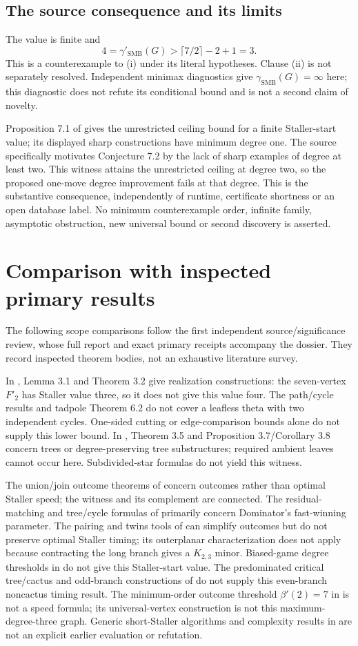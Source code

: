 \documentclass[11pt]{article}
\newcommand{\gs}{\gamma'_{\mathrm{SMB}}}
\newcommand{\gd}{\gamma_{\mathrm{SMB}}}
\begin{document}
\subsection{The source consequence and its limits}
The value is finite and
\[
4=\gs(G)>\lceil7/2\rceil-2+1=3.
\]
This is a counterexample to (i) under its literal hypotheses. Clause (ii) is not separately resolved. Independent minimax diagnostics give $\gd(G)=\infty$ here; this diagnostic does not refute its conditional bound and is not a second claim of novelty.

Proposition 7.1 of \cite{BD} gives the unrestricted ceiling bound for a finite Staller-start value; its displayed sharp constructions have minimum degree one. The source specifically motivates Conjecture 7.2 by the lack of sharp examples of degree at least two. This witness attains the unrestricted ceiling at degree two, so the proposed one-move degree improvement fails at that degree. This is the substantive consequence, independently of runtime, certificate shortness or an open database label. No minimum counterexample order, infinite family, asymptotic obstruction, new universal bound or second discovery is asserted.

\section{Comparison with inspected primary results}
The following scope comparisons follow the first independent source/significance review, whose full report and exact primary receipts accompany the dossier. They record inspected theorem bodies, not an exhaustive literature survey.

In \cite{BD}, Lemma 3.1 and Theorem 3.2 give realization constructions: the seven-vertex $F'_2$ has Staller value three, so it does not give this value four. The path/cycle results and tadpole Theorem 6.2 do not cover a leafless theta with two independent cycles. One-sided cutting or edge-comparison bounds alone do not supply this lower bound. In \cite{trees}, Theorem 3.5 and Proposition 3.7/Corollary 3.8 concern trees or degree-preserving tree substructures; required ambient leaves cannot occur here. Subdivided-star formulas do not yield this witness.

The union/join outcome theorems of \cite{original} concern outcomes rather than optimal Staller speed; the witness and its complement are connected. The residual-matching and tree/cycle formulas of \cite{numbers} primarily concern Dominator's fast-winning parameter. The pairing and twins tools of \cite{partition} can simplify outcomes but do not preserve optimal Staller timing; its outerplanar characterization does not apply because contracting the long branch gives a $K_{2,3}$ minor. Biased-game degree thresholds in \cite{biased} do not give this Staller-start value. The predominated critical tree/cactus and odd-branch constructions of \cite{critical} do not supply this even-branch noncactus timing result. The minimum-order outcome threshold $\beta'(2)=7$ in \cite{minimum} is not a speed formula; its universal-vertex construction is not this maximum-degree-three graph. Generic short-Staller algorithms and complexity results in \cite{complexity} are not an explicit earlier evaluation or refutation.
\end{document}
